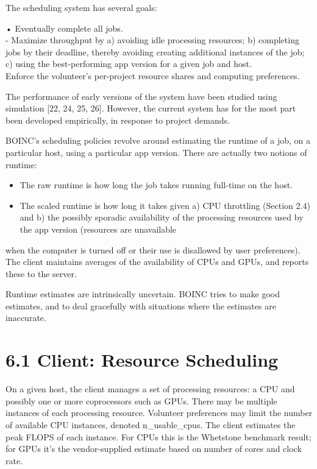 \documentclass[
]{article}
\providecommand{\tightlist}{%
  \setlength{\itemsep}{0pt}\setlength{\parskip}{0pt}}
\begin{document}
The scheduling system has several goals:

• Eventually complete all jobs.\\
- Maximize throughput by a) avoiding idle processing resources; b)
completing jobs by their deadline, thereby avoiding creating additional
instances of the job; c) using the best-performing app version for a
given job and host.\\
Enforce the volunteer's per-project resource shares and computing
preferences.

The performance of early versions of the system have been studied using
simulation {[}22, 24, 25, 26{]}. However, the current system has for the
most part been developed empirically, in response to project demands.

BOINC's scheduling policies revolve around estimating the runtime of a
job, on a particular host, using a particular app version. There are
actually two notions of runtime:

\begin{itemize}
\tightlist
\item
  The raw runtime is how long the job takes running full-time on the
  host.\\
\item
  The scaled runtime is how long it takes given a) CPU throttling
  (Section 2.4) and b) the possibly sporadic availability of the
  processing resources used by the app version (resources are
  unavailable
\end{itemize}

when the computer is turned off or their use is disallowed by user
preferences). The client maintains averages of the availability of CPUs
and GPUs, and reports these to the server.

Runtime estimates are intrinsically uncertain. BOINC tries to make good
estimates, and to deal gracefully with situations where the estimates
are inaccurate.

\section{6.1 Client: Resource
Scheduling}\label{client-resource-scheduling}

On a given host, the client manages a set of processing resources: a CPU
and possibly one or more coprocessors such as GPUs. There may be
multiple instances of each processing resource. Volunteer preferences
may limit the number of available CPU instances, denoted
n\_usable\_cpus. The client estimates the peak FLOPS of each instance.
For CPUs this is the Whetstone benchmark result; for GPUs it's the
vendor-supplied estimate based on number of cores and clock rate.
\end{document}
